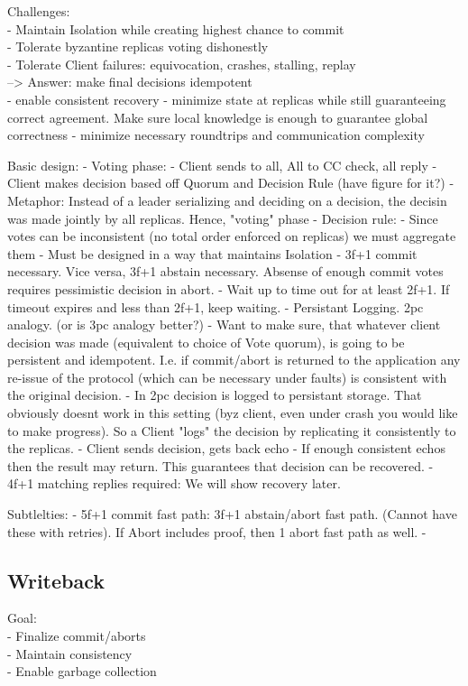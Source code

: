 Challenges:\\
- Maintain Isolation while creating highest chance to commit\\
- Tolerate byzantine replicas voting dishonestly\\
- Tolerate Client failures: equivocation, crashes, stalling, replay\\
--> Answer: make final decisions idempotent\\
- enable consistent recovery
- minimize state at replicas while still guaranteeing correct agreement. Make sure local knowledge is enough to guarantee global correctness
- minimize necessary roundtrips and communication complexity


Basic design:
- Voting phase:
	- Client sends to all, All to CC check, all reply
	- Client makes decision based off Quorum and Decision Rule (have figure for it?)
	- Metaphor: Instead of a leader serializing and deciding on a decision, the decisin was made jointly by all replicas. Hence, "voting" phase
- Decision rule:
	- Since votes can be inconsistent (no total order enforced on replicas) we must aggregate them
	- Must be designed in a way that maintains Isolation
	- 3f+1 commit necessary. Vice versa, 3f+1 abstain necessary. Absense of enough commit votes requires pessimistic decision in abort.
	- Wait up to time out for at least 2f+1. If timeout expires and less than 2f+1, keep waiting. 
- Persistant Logging. 2pc analogy. (or is 3pc analogy better?)
	- Want to make sure, that whatever client decision was made (equivalent to choice of Vote quorum), is going to be persistent and idempotent. I.e. if commit/abort is returned to the application any re-issue of the protocol (which can be necessary under faults) is consistent with the original decision.
	- In 2pc decision is logged to persistant storage. That obviously doesnt work in this setting (byz client, even under crash you would like to make progress). So a Client "logs" the decision by replicating it consistently to the replicas.
	- Client sends decision, gets back echo
	- If enough consistent echos then the result may return. This guarantees that decision can be recovered.
	- 4f+1 matching replies required: We will show recovery later.

Subtlelties:
- 5f+1 commit fast path: 3f+1 abstain/abort fast path. (Cannot have these with retries). If Abort includes proof, then 1 abort fast path as well.
- 


\subsection{Writeback}
Goal: \\
- Finalize commit/aborts\\
- Maintain consistency\\
- Enable garbage collection\\

